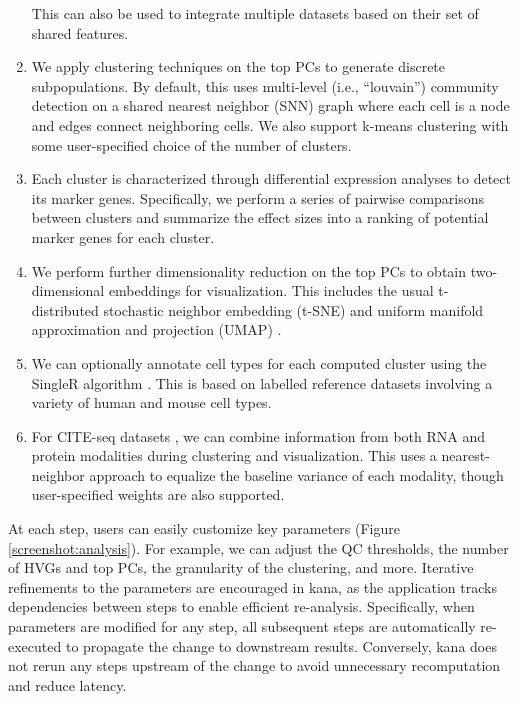 \documentclass{article}
\begin{document}
\begin{enumerate}
This can also be used to integrate multiple datasets based on their set of shared features.
\item We apply clustering techniques on the top PCs to generate discrete subpopulations.
By default, this uses multi-level (i.e., ``louvain'') community detection on a shared nearest neighbor (SNN) graph where each cell is a node and edges connect neighboring cells.
We also support k-means clustering with some user-specified choice of the number of clusters.
\item Each cluster is characterized through differential expression analyses to detect its marker genes.
Specifically, we perform a series of pairwise comparisons between clusters and summarize the effect sizes into a ranking of potential marker genes for each cluster.
\item We perform further dimensionality reduction on the top PCs to obtain two-dimensional embeddings for visualization. 
This includes the usual t-distributed stochastic neighbor embedding (t-SNE) and uniform manifold approximation and projection (UMAP) \cite{maaten2014accelerating,mcinnes2018umap}.
\item We can optionally annotate cell types for each computed cluster using the SingleR algorithm \cite{aran2019reference}.
This is based on labelled reference datasets involving a variety of human and mouse cell types.
\item For CITE-seq datasets \cite{stoeckius2017simultaneous}, we can combine information from both RNA and protein modalities during clustering and visualization.
This uses a nearest-neighbor approach to equalize the baseline variance of each modality, though user-specified weights are also supported. 
\end{enumerate}

At each step, users can easily customize key parameters (Figure \ref{screenshot:analysis}).
For example, we can adjust the QC thresholds, the number of HVGs and top PCs, the granularity of the clustering, and more. 
Iterative refinements to the parameters are encouraged in kana, as the application tracks dependencies between steps to enable efficient re-analysis.
Specifically, when parameters are modified for any step, all subsequent steps are automatically re-executed to propagate the change to downstream results.
Conversely, kana does not rerun any steps upstream of the change to avoid unnecessary recomputation and reduce latency.
\end{document}
